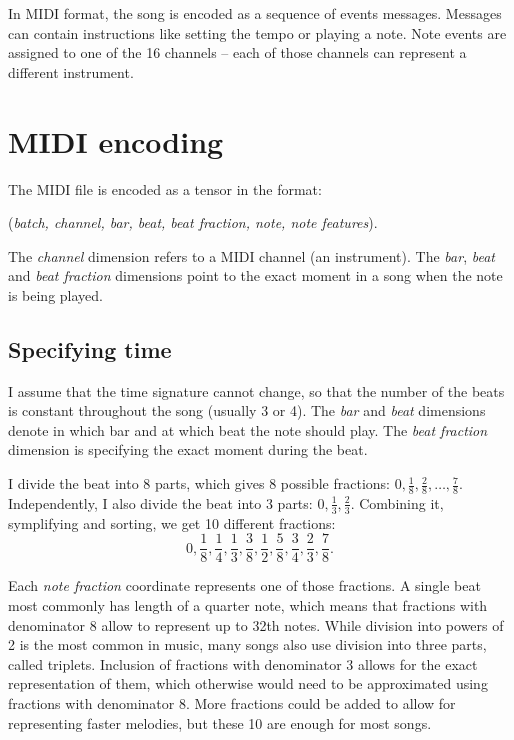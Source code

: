 \documentclass[en]{pracamgr}
\begin{document}
In MIDI format, the song is encoded as a sequence of events messages.
Messages can contain instructions like setting the tempo or playing a note.
Note events are assigned to one of the 16 channels -- each of those channels can represent a different instrument.

\section{MIDI encoding}

The MIDI file is encoded as a tensor in the format:
\begin{center}
    (\emph{batch, channel, bar, beat, beat fraction, note, note features}).
\end{center}

The \emph{channel} dimension refers to a MIDI channel (an instrument).
The \emph{bar}, \emph{beat} and \emph{beat fraction} dimensions point to the exact moment in a song when the note is being played.

\subsection{Specifying time}

I assume that the time signature cannot change, so that the number of the beats is constant throughout the song (usually 3 or 4).
The \emph{bar} and \emph{beat} dimensions denote in which bar and at which beat the note should play.
The \emph{beat fraction} dimension is specifying the exact moment during the beat.

I divide the beat into 8 parts, which gives 8 possible fractions: $0, \frac{1}{8}, \frac{2}{8}, \ldots, \frac{7}{8}$.
Independently, I also divide the beat into 3 parts: $0, \frac{1}{3}, \frac{2}{3}$.
Combining it, symplifying and sorting, we get 10 different fractions:
$$
0, \frac{1}{8}, \frac{1}{4}, \frac{1}{3}, \frac{3}{8}, \frac{1}{2}, \frac{5}{8}, \frac{3}{4}, \frac{2}{3}, \frac{7}{8}.
$$

Each \emph{note fraction} coordinate represents one of those fractions.
A single beat most commonly has length of a quarter note, which means that fractions with denominator 8 allow to represent up to 32th notes.
While division into powers of 2 is the most common in music, many songs also use division into three parts, called triplets.
Inclusion of fractions with denominator 3 allows for the exact representation of them, which otherwise would need to be approximated using fractions with denominator 8.
More fractions could be added to allow for representing faster melodies, but these 10 are enough for most songs.
\end{document}
